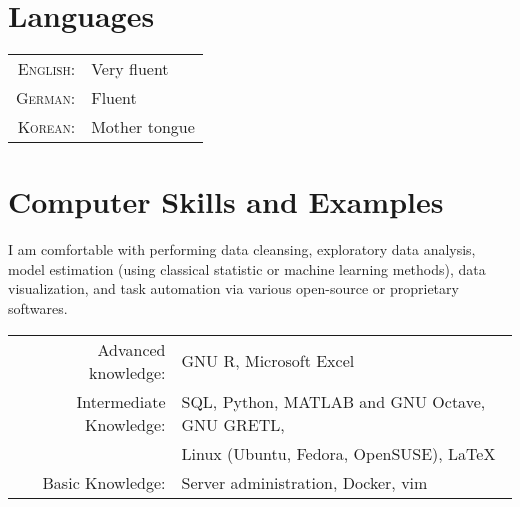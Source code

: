 \documentclass[a4paper,10pt]{article} %
\begin{document}
\section{Languages}

\begin{tabular}{rl}
\textsc{English:} & Very fluent\\

\textsc{German:} & Fluent\\

\textsc{Korean:} & Mother tongue\\

\end{tabular}


\section{Computer Skills and Examples}

I am comfortable with performing data cleansing, exploratory data analysis,
model estimation (using classical statistic or machine learning methods),
data visualization, and task automation via various open-source or proprietary
softwares.

\begin{tabular}{rl}
Advanced knowledge: & GNU R, Microsoft Excel\\
Intermediate Knowledge: & SQL, Python, MATLAB and GNU Octave, GNU GRETL,
\\& Linux (Ubuntu, Fedora, OpenSUSE), \LaTeX\\
Basic Knowledge: & Server administration, Docker, vim\\
\end{tabular}
\end{document}
